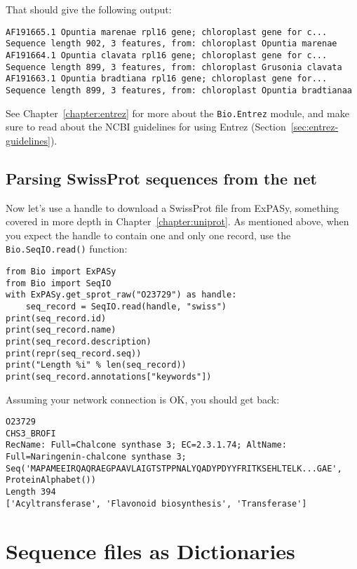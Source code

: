 \noindent That should give the following output:

\begin{verbatim}
AF191665.1 Opuntia marenae rpl16 gene; chloroplast gene for c...
Sequence length 902, 3 features, from: chloroplast Opuntia marenae
AF191664.1 Opuntia clavata rpl16 gene; chloroplast gene for c...
Sequence length 899, 3 features, from: chloroplast Grusonia clavata
AF191663.1 Opuntia bradtiana rpl16 gene; chloroplast gene for...
Sequence length 899, 3 features, from: chloroplast Opuntia bradtianaa
\end{verbatim}

See Chapter~\ref{chapter:entrez} for more about the \verb|Bio.Entrez| module, and make sure to read about the NCBI guidelines for using Entrez (Section~\ref{sec:entrez-guidelines}).

\subsection{Parsing SwissProt sequences from the net}
\label{sec:SeqIO_ExPASy_and_SwissProt}
Now let's use a handle to download a SwissProt file from ExPASy,
something covered in more depth in Chapter~\ref{chapter:uniprot}.
As mentioned above, when you expect the handle to contain one and only one record,
use the \verb|Bio.SeqIO.read()| function:

\begin{verbatim}
from Bio import ExPASy
from Bio import SeqIO
with ExPASy.get_sprot_raw("O23729") as handle:
    seq_record = SeqIO.read(handle, "swiss")
print(seq_record.id)
print(seq_record.name)
print(seq_record.description)
print(repr(seq_record.seq))
print("Length %i" % len(seq_record))
print(seq_record.annotations["keywords"])
\end{verbatim}

\noindent Assuming your network connection is OK, you should get back:

\begin{verbatim}
O23729
CHS3_BROFI
RecName: Full=Chalcone synthase 3; EC=2.3.1.74; AltName: Full=Naringenin-chalcone synthase 3;
Seq('MAPAMEEIRQAQRAEGPAAVLAIGTSTPPNALYQADYPDYYFRITKSEHLTELK...GAE', ProteinAlphabet())
Length 394
['Acyltransferase', 'Flavonoid biosynthesis', 'Transferase']
\end{verbatim}

\section{Sequence files as Dictionaries}

